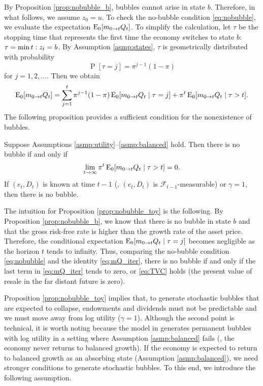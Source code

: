 \documentclass[a4paper,12pt]{article}
\newcommand{\F}{\mathcal{F}}
\renewcommand{\Pr}{\operatorname{P}}
\numberwithin{equation}{section}
\theoremstyle{plain}
\begin{document}
By Proposition \ref{prop:nobubble_b}, bubbles cannot arise in state $b$. Therefore, in what follows, we assume $z_0=u$. To check the no-bubble condition \eqref{eq:nobubble}, we evaluate the expectation $\operatorname{E}_0[m_{0\to t}Q_t]$. To simplify the calculation, let $\tau$ be the stopping time that represents the first time the economy switches to state $b$: $\tau=\min\set{t:z_t=b}$. By Assumption \ref{asmp:states}, $\tau$ is geometrically distributed with probability
\begin{equation}
    \Pr[\tau=j]=\pi^{j-1}(1-\pi) \label{eq:p_geometric}
\end{equation}
for $j=1,2,\dotsc$. Then we obtain
\begin{equation}
    \operatorname{E}_0[m_{0\to t}Q_t]=\sum_{j=1}^t\pi^{j-1}(1-\pi)\operatorname{E}_0[m_{0\to t}Q_t \mid \tau=j]+\pi^t\operatorname{E}_0[m_{0\to t}Q_t \mid \tau>t]. \label{eq:mQ_iter}
\end{equation}
The following proposition provides a sufficient condition for the nonexistence of bubbles.

\begin{prop}\label{prop:nobubble_toy}
Suppose Assumptions \ref{asmp:utility}--\ref{asmp:balanced} hold. Then there is no bubble if and only if
\begin{equation}
    \lim_{t\to\infty}\pi^t\operatorname{E}_0[m_{0\to t}Q_t \mid \tau>t]=0. \label{eq:TVC}
\end{equation}
If $(e_t,D_t)$ is known at time $t-1$ (\ie, $(e_t,D_t)$ is $\F_{t-1}$-measurable) or $\gamma=1$, then there is no bubble. 
\end{prop}

The intuition for Proposition \ref{prop:nobubble_toy} is the following. By Proposition \ref{prop:nobubble_b}, we know that there is no bubble in state $b$ and that the gross risk-free rate is higher than the growth rate of the asset price. Therefore, the conditional expectation $\operatorname{E}_0[m_{0\to t}Q_t \mid \tau=j]$ becomes negligible as the horizon $t$ tends to infinity. Thus, comparing the no-bubble condition \eqref{eq:nobubble} and the identity \eqref{eq:mQ_iter}, there is no bubble if and only if the last term in \eqref{eq:mQ_iter} tends to zero, or \eqref{eq:TVC} holds (the present value of resale in the far distant future is zero).

Proposition \ref{prop:nobubble_toy} implies that, to generate stochastic bubbles that are expected to collapse, endowments and dividends must not be predictable and we must move away from log utility ($\gamma=1$). Although the second point is technical, it is worth noting because the model in \citet{HiranoToda2025PNAS} generates permanent bubbles with log utility in a setting where Assumption \ref{asmp:balanced} fails (\ie, the economy never returns to balanced growth). If the economy is expected to return to balanced growth as an absorbing state (Assumption \ref{asmp:balanced}), we need stronger conditions to generate stochastic bubbles. To this end, we introduce the following assumption.
\end{document}
